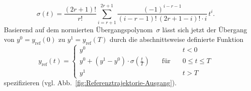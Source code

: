 \begin{equation}
\sigma(t)=\frac{(2r+1)!}{r!}\sum_{i=r+1}^{2r+1}\frac{(-1)^{i-r-1}}{(i-r-1)!\,(2r+1-i)!\cdot i}\,t^{i}.\label{eq:formel-uebergangspolynom}
\end{equation}
Basierend auf dem normierten Übergangspolynom~$\sigma$ lässt sich
jetzt der Übergang von $y^{0}=y_{\text{ref}}(0)$ zu $y^{1}=y_{\text{ref}}(T)$
durch die abschnittsweise definierte Funktion
\begin{equation}
y_{\text{ref}}(t)=\left\{ \begin{array}{ccl}
y^{0} &  & t<0\\
y^{0}+(y^{1}-y^{0})\cdot\sigma\left(\frac{t}{T}\right) & \quad\text{für}\quad & 0\leq t\leq T\\
y^{1} &  & t>T
\end{array}\right.\label{eq:yref-allgemein}
\end{equation}
spezifizieren (vgl. Abb.~\ref{fig:Referenztrajektorie-Ausgang}).

